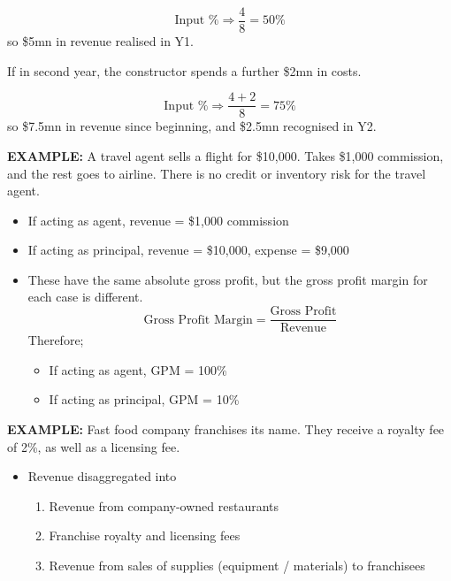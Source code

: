 \documentclass[../notes_compiled.tex]{subfiles}
\begin{document}
\begin{itemize}
\begin{itemize}
{}
{\color{RoyalBlue}
\begin{equation*}
\text{Input \%} \Rightarrow \frac{4}{8} = 50\%
\end{equation*}
so \$5mn in revenue realised in Y1.
}
{\color{RedViolet}
\item If in second year, the constructor spends a further \$2mn in costs.
}
{\color{RoyalBlue}
\begin{equation*}
\text{Input \%} \Rightarrow \frac{4+2}{8} = 75\%
\end{equation*}
so \$7.5mn in revenue since beginning, and \$2.5mn recognised in Y2.
}
\end{itemize}
{\color{RedViolet}
\item[] \textbf{EXAMPLE:} A travel agent sells a flight for \$10,000. Takes \$1,000 commission, and the rest goes to airline. There is no credit or inventory risk for the travel agent.
}
{\color{RoyalBlue}
\begin{itemize}
\item If acting as agent, revenue = \$1,000 commission
\item If acting as principal, revenue = \$10,000, expense = \$9,000
\item[] These have the same absolute gross profit, but the gross profit margin for each case is different.
\begin{equation*}
\text{Gross Profit Margin} = \frac{\text{Gross Profit}}{\text{Revenue}}
\end{equation*}
Therefore;
\begin{itemize}
\item If acting as agent, GPM = 100\%
\item If acting as principal, GPM = 10\%
\end{itemize}
\end{itemize}
}
{\color{RedViolet}
\item[] \textbf{EXAMPLE:} Fast food company franchises its name. They receive a royalty fee of 2\%, as well as a licensing fee.
}
{\color{RoyalBlue}
\begin{itemize}
\item Revenue disaggregated into
\begin{enumerate}
\item Revenue from company-owned restaurants
\item Franchise royalty and licensing fees
\item Revenue from sales of supplies (equipment / materials) to franchisees
\end{enumerate}
\end{itemize}
}
\end{itemize}
\end{document}
